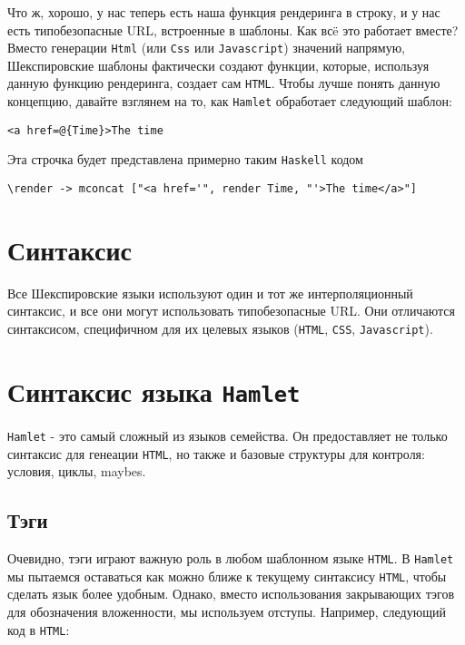 Что ж, хорошо, у нас теперь есть наша функция рендеринга в строку, и у нас есть
типобезопасные URL, встроенные в шаблоны. Как всë это работает вместе?
Вместо генерации \lstinline!Html! (или \lstinline!Css! или \lstinline!Javascript!) значений напрямую, 
Шекспировские шаблоны фактически создают функции, которые, используя данную
функцию рендеринга, создает сам \texttt{HTML}. Чтобы лучше понять данную концепцию,
давайте взглянем на то, как \texttt{Hamlet} обработает следующий шаблон:

\begin{lstlisting}
<a href=@{Time}>The time                                                        
\end{lstlisting}
                                                                                
Эта строчка будет представлена примерно таким \texttt{Haskell} кодом 

\begin{lstlisting}
\render -> mconcat ["<a href='", render Time, "'>The time</a>"]     
\end{lstlisting}

\section{Синтаксис}
Все Шекспировские языки используют один и тот же интерполяционный синтаксис, 
и все они могут использовать типобезопасные URL. Они отличаются синтаксисом,
специфичном для их целевых языков (\texttt{HTML}, \texttt{CSS}, \texttt{Javascript}).

\section{Синтаксис языка \texttt{Hamlet}}
\texttt{Hamlet} - это самый сложный из языков семейства. Он предоставляет не только 
синтаксис для генеации \texttt{HTML}, но также и базовые структуры для контроля: 
условия, циклы, maybes.

\subsection{Тэги}
Очевидно, тэги играют важную роль в любом шаблонном языке \texttt{HTML}. В \texttt{Hamlet}
мы пытаемся оставаться как можно ближе к текущему синтаксису \texttt{HTML}, чтобы
сделать язык более удобным. Однако, вместо использования закрывающих тэгов
для обозначения вложенности, мы используем отступы. Например, следующий код
в \texttt{HTML}:

